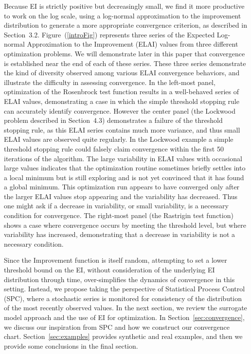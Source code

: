 \documentclass{article}
\begin{document}
Because EI is strictly positive but decreasingly small, we find it more 
productive to work on the log scale, using a log-normal approximation to the 
improvement distribution to generate a more appropriate convergence criterion, 
as described in Section~3.2. Figure~(\ref{introFig}) represents 
three series of the Expected Log-normal Approximation to the Improvement (ELAI) 
values from three different optimization problems. We will demonstrate later 
in this paper that convergence is established near the end of each of these 
series. These three series demonstrate the kind of diversity observed among 
various ELAI convergence behaviors, and illustrate the difficulty in assessing 
convergence. In the left-most panel, optimization of the Rosenbrock test 
function results in a well-behaved series of ELAI values, demonstrating a case 
in which the simple threshold stopping rule can accurately identify convergence. 
However the center panel (the Lockwood problem described in
Section~4.3) demonstrates a failure of the  
threshold stopping rule, as this ELAI series contains much more variance, and 
thus small ELAI values are observed quite regularly. In the Lockwood example a 
simple threshold stopping rule could falsely claim convergence within the first 
50 iterations of the algorithm. The large variability in ELAI values with 
occasional large values indicates that the optimization routine sometimes 
briefly settles into a local minimum but is still exploring and is not yet 
convinced that it has found a global minimum. This optimization run appears to 
have converged only after the larger ELAI values stop appearing and the 
variability has decreased. Thus one might ask if a decrease in variability, or 
small variability, is a necessary condition for convergence. The right-most 
panel (the Rastrigin test function) shows a case where convergence occurs by 
meeting the threshold level, but where variability has increased, demonstrating 
that a decrease in variability is not a necessary condition. 

%
%

%
Since the Improvement function is itself random, attempting to set a lower 
threshold bound on the EI, without consideration of the underlying EI 
distribution through time, over-simplifies the dynamics of convergence in this 
setting. Instead, we propose taking the perspective of Statistical Process 
Control (SPC), where a stochastic series is monitored for consistency of the 
distribution of the most recently observed values. In the next section, we 
review the surrogate model approach and the use of EI for 
optimization. In Section~\ref{sec:convergence}, we discuss our inspiration from 
SPC and how we construct our convergence chart. Section~\ref{sec:examples} 
provides synthetic and real examples, and then we provide some conclusions in 
the final section. 
\end{document}

